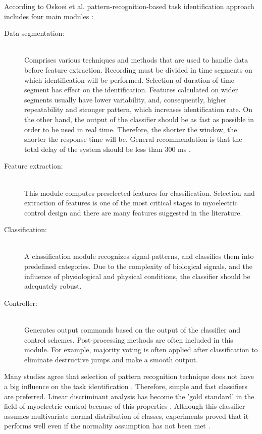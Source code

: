 According to Oskoei et al. pattern-recognition-based task identification approach includes four main modules \citep{Oskoei2007}:
\begin{description}
\item[Data segmentation:] \hfill \\
Comprises various techniques and methods that are used to handle data before feature extraction. Recording must be divided in time segments on which identification will be performed. Selection of duration of time segment has effect on the identification. Features calculated on wider segments usually have lower variability, and, consequently, higher repeatability and stronger pattern, which increases identification rate. On the other hand, the output of the classifier should be as fast as possible in order to be used in real time.  Therefore, the shorter the window, the shorter the response time will be. General recommendation is that the total delay of the system should be less than 300 ms \citep{Oskoei2007, Englehart2003}. 

\item[Feature extraction:] \hfill \\
This module computes preselected features for classification. Selection and extraction of features is one of the most critical stages in myoelectric control design and there are many features suggested in the literature. 

\item[Classification:] \hfill \\
A classification module recognizes signal patterns, and classifies them into predefined categories. Due to the complexity of biological signals, and the influence of physiological and physical conditions, the classifier should be adequately robust.

\item[Controller:] \hfill \\Generates output commands based on the output of the classifier and control schemes. Post-processing methods are often included in this module. For example, majority voting is often applied after classification to eliminate destructive jumps and make a smooth output.
\end{description}

Many studies agree that selection of pattern recognition technique does not have a big influence on the task identification \citep{Hakonen2015}. Therefore, simple and fast classifiers are preferred. Linear discriminant analysis has become the 'gold standard' in the field of myoelectric control because of this properties \citep{Tkach2010, Li2014, Hakonen2015}. Although this classifier assumes multivariate normal distribution of classes, experiments proved that it performs well even if the normality assumption has not been met \citep{Grouven1996}.

